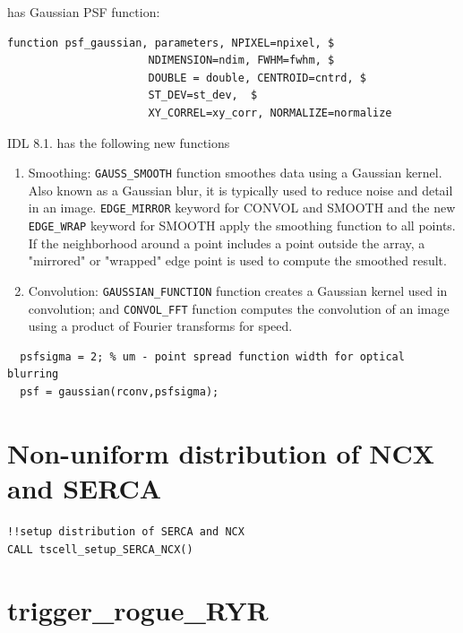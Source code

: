  has
Gaussian PSF function:
\begin{verbatim}
function psf_gaussian, parameters, NPIXEL=npixel, $
                      NDIMENSION=ndim, FWHM=fwhm, $ 
                      DOUBLE = double, CENTROID=cntrd, $
                      ST_DEV=st_dev,  $
                      XY_CORREL=xy_corr, NORMALIZE=normalize
\end{verbatim}


IDL 8.1. has the following new functions
\begin{enumerate}
  \item Smoothing: \verb!GAUSS_SMOOTH! function smoothes data using a Gaussian
  kernel. Also known as a Gaussian blur, it is typically used to reduce noise
  and detail in an image. \verb!EDGE_MIRROR! keyword for CONVOL and SMOOTH and
  the new \verb!EDGE_WRAP! keyword for SMOOTH apply the smoothing function to
  all points. If the neighborhood around a point includes a point outside the array,
  a "mirrored" or "wrapped" edge point is used to compute the smoothed result.  
  \item Convolution: \verb!GAUSSIAN_FUNCTION! function creates a Gaussian kernel
  used in convolution; and \verb!CONVOL_FFT! function computes the convolution
  of an image using a product of Fourier transforms for speed.
\end{enumerate}

  \begin{verbatim}
  psfsigma = 2; % um - point spread function width for optical blurring 
  psf = gaussian(rconv,psfsigma);
  \end{verbatim}

\section{Non-uniform distribution of NCX and SERCA}

\begin{verbatim}
!!setup distribution of SERCA and NCX                                                                                                                                                                                                                                                                                      
CALL tscell_setup_SERCA_NCX()
\end{verbatim}

\section{trigger\_rogue\_RYR}
\label{sec:trigger_rogue_RYR}


